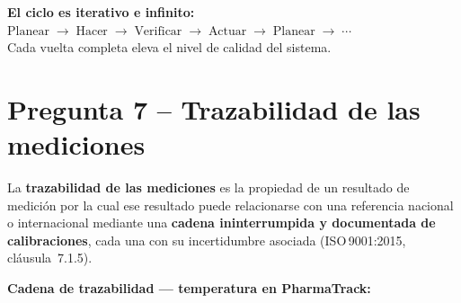 \vspace{10pt}
\begin{tcolorbox}[enhanced, colback=azulclaro, colframe=azulborde, arc=4pt,
    boxrule=1pt, left=8pt, right=8pt, top=6pt, bottom=6pt]
\centering
\textbf{\color{azulprin}El ciclo es iterativo e infinito:}\\[4pt]
$\text{Planear} \;\longrightarrow\; \text{Hacer} \;\longrightarrow\;
 \text{Verificar} \;\longrightarrow\; \text{Actuar} \;\longrightarrow\;
 \text{Planear} \;\longrightarrow\; \cdots$\\[4pt]
Cada vuelta completa eleva el nivel de calidad del sistema.
\end{tcolorbox}


\newpage
\section{Pregunta 7 -- Trazabilidad de las mediciones}


\begin{tcolorbox}[resultadoStyle, title={Definici\'on}]
La \textbf{trazabilidad de las mediciones} es la propiedad de un resultado de
medici\'on por la cual ese resultado puede relacionarse con una referencia
nacional o internacional mediante una \textbf{cadena ininterrumpida y documentada
de calibraciones}, cada una con su incertidumbre asociada
(ISO\,9001:2015, cl\'ausula~7.1.5).
\end{tcolorbox}

\vspace{10pt}
\noindent\textbf{Cadena de trazabilidad --- temperatura en PharmaTrack:}

